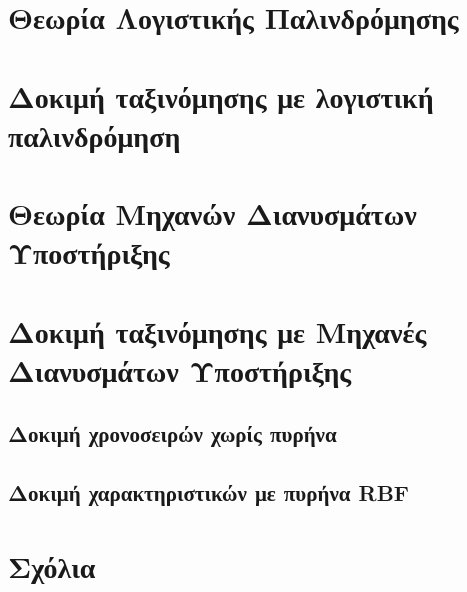 \section{Θεωρία Λογιστικής Παλινδρόμησης}
\section{Δοκιμή ταξινόμησης με λογιστική παλινδρόμηση}
\section{Θεωρία Μηχανών Διανυσμάτων Υποστήριξης}
\section{Δοκιμή ταξινόμησης με Μηχανές Διανυσμάτων Υποστήριξης}
\subsection{Δοκιμή χρονοσειρών χωρίς πυρήνα}
\subsection{Δοκιμή χαρακτηριστικών με πυρήνα RBF}
\section{Σχόλια}